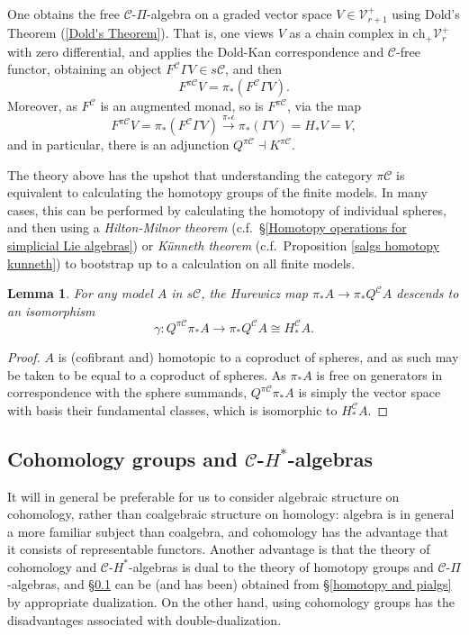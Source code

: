 \documentclass[11pt]{amsart} \renewcommand{\baselinestretch}{1.2}
\theoremstyle{plain}
\newtheorem{lem}[thm]{Lemma}
\numberwithin{equation}{section} %
\theoremstyle{plain}
\newtheorem{lem}[thm]{Lemma}
\numberwithin{equation}{chapter} %
\renewcommand{\to}{\longrightarrow}
\newcommand{\calC}{\mathcal{C}}
\newcommand{\calV}{\mathcal{V}}
\newcommand{\calc}{\mathcal{C}}
\newcommand{\vect}[2]{\calV^{#1}_{#2}}
\newcommand{\PA}[1]{\pi#1}
\newcommand{\complexes}{\mathrm{ch}_+}
\newcommand{\SubsectionOrSection}[1]{\subsection{#1}}
\begin{document}
\begin{Pi-algebras and cohomology algebras}
One obtains the free $\calc$-$\Pi$-algebra on a graded vector space $V\in \vect{+}{r+1}$ using Dold's Theorem (\ref{Dold's Theorem}). That is, one views $V$ as a chain complex in $\complexes\vect{+}{r}$ with zero differential, and applies the Dold-Kan correspondence and $\calc$-free functor, obtaining an object $F^\calc\Gamma V\in s\calc$, and then
\[F^{\PA{\calc}}V=\pi_*(F^\calc\Gamma V).\]
Moreover, as $F^\calc $ is an augmented monad, so is $F^{\PA{\calc}}$, via the map
\[F^{\PA{\calc}}V=\pi_*(F^\calc\Gamma V)\overset{\pi_*\epsilon}{\to}\pi_*(\Gamma V)=H_*V=V,\]
and in particular, there is an adjunction $Q^{\PA{\calc}}\dashv K^{\PA{\calc}}$.

The theory above has the upshot that understanding the category $\PA{\calc}$ is equivalent to calculating the homotopy groups of the finite models. In many cases, this can be performed by calculating the homotopy of individual spheres, and then using a \emph{Hilton-Milnor theorem} (c.f.\ \S\ref{Homotopy operations for simplicial Lie algebras}) or \emph{K\"unneth theorem} (c.f.\ Proposition \ref{salgs homotopy kunneth}) to bootstrap up to a calculation on all finite models.



\begin{lem}
\label{Q of a model}
For any model $A$ in $s\calc$, the Hurewicz map $\pi_*A\to \pi_*Q^\calc A$ descends to an isomorphism
\[\gamma:Q^{\PA{\calc}}\pi_* A\to \pi_* Q^{\calc}A\cong H_*^{\calc}A.\]
\end{lem}
\begin{proof} $A$ is (cofibrant and) homotopic to a coproduct of spheres, and as such may be taken to be equal to a coproduct of spheres. As $\pi_* A$ is free on generators in correspondence with the sphere summands, $Q^{\PA{\calc}}\pi_* A$ is simply the vector space with basis their fundamental classes, which is isomorphic to $H_*^{\calc}A$.
\end{proof}
\SubsectionOrSection{Cohomology groups and $\calc$-$H^*$-algebras}\label{cohomology and Halgs}
It will in general be preferable for us to consider algebraic structure on cohomology, rather than coalgebraic structure on homology: algebra is in general a more familiar subject than coalgebra, and cohomology has the advantage that it consists of representable functors. 
Another advantage is that the theory of cohomology and $\calC$-$H^*$-algebras is dual to the theory of homotopy groups and $\calC$-$\Pi$-algebras, and \S\ref{cohomology and Halgs} can be (and has been) obtained from \S\ref{homotopy and pialgs} by appropriate dualization. On the other hand, using cohomology groups has the disadvantages associated with double-dualization.


\end{Pi-algebras and cohomology algebras}
\end{document}
